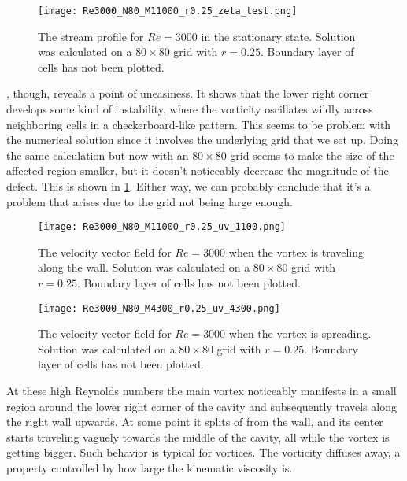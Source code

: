 \documentclass[10pt,a4paper,twocolumn]{article}
\begin{document}
\begin{figure}[!b]
    \centering
    \texttt{[image: Re3000\_N80\_M11000\_r0.25\_zeta\_test.png]}
    \caption{The stream profile for $Re=3000$ in the stationary state. Solution was calculated on a $80 \times 80$ grid with $r=0.25$. Boundary layer of cells has not been plotted.}
    \label{fig:Re3000_N80_zeta}
\end{figure}

, though, reveals a point of uneasiness. It shows that the lower right corner develops some kind of instability, where the vorticity oscillates wildly across neighboring cells in a checkerboard-like pattern. This seems to be problem with the numerical solution since it involves the underlying grid that we set up. Doing the same calculation but now with an $80 \times 80$ grid seems to make the size of the affected region smaller, but it doesn't noticeably decrease the magnitude of the defect. This is shown in \cref{fig:Re3000_N80_zeta}. Either way, we can probably conclude that it's a problem that arises due to the grid not being large enough.

\begin{figure}[!h]
    \centering
    \texttt{[image: Re3000\_N80\_M11000\_r0.25\_uv\_1100.png]}
    \caption{The velocity vector field for $Re=3000$ when the vortex is traveling along the wall. Solution was calculated on a $80 \times 80$ grid with $r=0.25$. Boundary layer of cells has not been plotted.}
    \label{fig:Re3000_uv_alongwall}
\end{figure}

\begin{figure}[!t]
    \centering
    \texttt{[image: Re3000\_N80\_M4300\_r0.25\_uv\_4300.png]}
    \caption{The velocity vector field for $Re=3000$ when the vortex is spreading. Solution was calculated on a $80 \times 80$ grid with $r=0.25$. Boundary layer of cells has not been plotted.}
    \label{fig:Re3000_uv_spreading}
\end{figure}

At these high Reynolds numbers the main vortex noticeably manifests in a small region around the lower right corner of the cavity and subsequently travels along the right wall upwards. At some point it splits of from the wall, and its center starts traveling vaguely towards the middle of the cavity, all while the vortex is getting bigger. Such behavior is typical for vortices. The vorticity diffuses away, a property controlled by how large the kinematic viscosity is.
\end{document}
